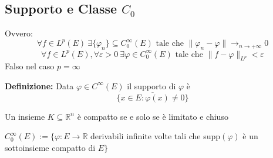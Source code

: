 \documentclass[a4paper]{article}
\newcommand{\R}{\mathbb{R}}
\begin{document}
\subsection{Supporto e Classe $C_0$}
Ovvero:
\[\forall f \in L^{p}(E)\ \exists \{ \varphi_n\}	\subseteq  C_0^\infty(E) \text{ tale che } \|\varphi_n -\varphi\|\to _{n\to +\infty}0\]
\[\forall f\in L^{p}(E),\forall \varepsilon>0\ \exists \varphi\in C_0^\infty(E)\text{ tale che }\|f-\varphi\|_{L^{p}}<\varepsilon
\] 
Falso nel caso $p=\infty$
\begin{tcolorbox}
	\textbf{Definizione:} Data $\varphi\in C^\infty(E)$ il supporto di $\varphi$ è 
	\[\overline{\{x\in E:\varphi(x)\neq 0\}} \]
\end{tcolorbox}
\begin{tcolorbox}
	Un insieme $K\subseteq  \R^n$ è compatto se e solo se è limitato e chiuso
\end{tcolorbox}
\begin{tcolorbox}
	$C_0^\infty(E):=\{\varphi :E\to \R$ derivabili infinite volte tali che supp$(\varphi)$ è un sottoinsieme compatto di $E\} $
\end{tcolorbox}
\end{document}
